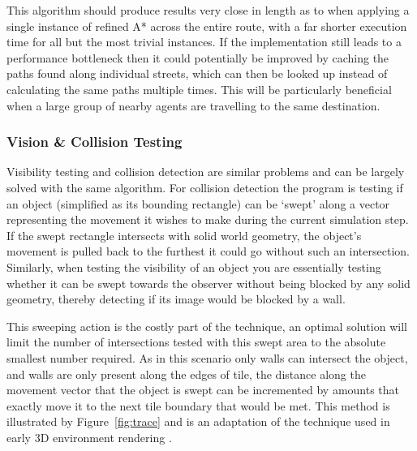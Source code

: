 \documentclass[12pt,a4paper]{article}
\begin{document}
This algorithm should produce results very close in length as to when applying a single instance of refined A* across the entire route, with a far shorter execution time for all but the most trivial instances. If the implementation still leads to a performance bottleneck then it could potentially be improved by caching the paths found along individual streets, which can then be looked up instead of calculating the same paths multiple times. This will be particularly beneficial when a large group of nearby agents are travelling to the same destination.

\subsubsection{Vision \& Collision Testing}\noindent
Visibility testing and collision detection are similar problems and can be largely solved with the same algorithm. For collision detection the program is testing if an object (simplified as its bounding rectangle)
can be `swept' along a vector representing the movement it wishes to make during the current simulation step. If the swept rectangle intersects with solid world geometry, the object's movement is pulled back to the furthest it could go without such an intersection. Similarly, when testing the visibility of an object you are essentially testing whether it can be swept towards the observer without being blocked by any solid geometry, thereby detecting if its image would be blocked by a wall.

This sweeping action is the costly part of the technique, an optimal solution will limit the number of intersections tested with this swept area to the absolute smallest number required. As in this scenario only walls can intersect the object, and walls are only present along the edges of tile, the distance along the movement vector that the object is swept can be incremented by amounts that exactly move it to the next tile boundary that would be met. This method is illustrated by Figure~\ref{fig:trace} and is an adaptation of the technique used in early 3D environment rendering \cite{raycast}.
\end{document}
